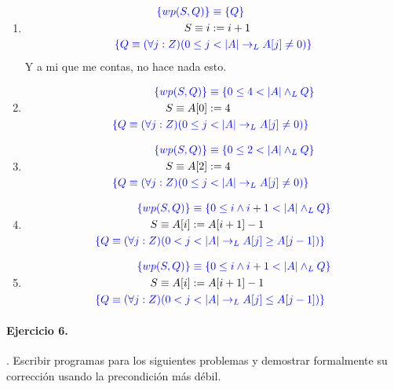 \documentclass{article}
\begin{document}
\begin{enumerate}[label=\alph*)]
	\item
		\begin{align*}
		\color{blue}\{wp(S,Q)\} &\color{blue}
			\equiv \{Q\}\\
		S \equiv i &:= i + 1\\
		\color{blue}\{Q \equiv  (\forall j :Z)(0 \leq j & \color{blue} <|A| \rightarrow_L A[j] \neq 0)\}
		\end{align*}
		Y a mi que me contas, no hace nada esto.
	\item
		\begin{align*}
		\color{blue}\{wp(S,Q)\} &\color{blue}
			\equiv \{0\leq 4 <|A|\wedge_L Q\}\\
		S \equiv A[0] &:= 4\\
		\color{blue}\{Q \equiv (\forall j :Z)(0 \leq j & \color{blue}< |A| 
			\rightarrow_L A[j] \neq 0)\}
		\end{align*}
	\item
		\begin{align*}
		\color{blue}\{wp(S,Q)\} &\color{blue}
			\equiv \{0\leq 2 <|A|\wedge_L Q\}\\
		S \equiv A[2] &:= 4\\
		\color{blue}\{Q \equiv (\forall j :Z)(0 \leq j & \color{blue}< |A| 
			\rightarrow_L A[j] \neq 0)\}
		\end{align*}
	\item
		\begin{align*}
		\color{blue}\{wp(S,Q)\} &\color{blue}
			\equiv \{0\leq i\wedge i+1<|A|\wedge_L Q\}\\
		S \equiv A[i] &:= A[i+1] - 1\\
		\color{blue}\{Q \equiv (\forall j :Z)(0 < j & \color{blue}< |A| 
			\rightarrow_L A[j] \geq A[j - 1])\}
		\end{align*}
	\item
		\begin{align*}
		\color{blue}\{wp(S,Q)\} &\color{blue}
			\equiv \{0\leq i\wedge i+1<|A|\wedge_L Q\}\\
		S \equiv A[i] &:= A[i+1] - 1\\
		\color{blue}\{Q \equiv (\forall j :Z)(0 < j & \color{blue}< |A| 
			\rightarrow_L A[j] \leq A[j - 1])\}
		\end{align*}
\end{enumerate}

\paragraph{Ejercicio 6.}. Escribir programas para los siguientes problemas y demostrar 
formalmente su corrección usando la precondición
más débil.
\end{document}
